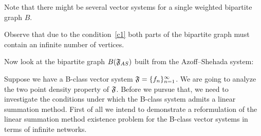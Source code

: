 \documentclass[12pt]{amsart}
\begin{document}
    \begin{remark}
      Note that there might be several vector systems for a single weighted bipartite graph $B$.
    \end{remark}
    \begin{remark}
      Observe that due to the condition~\ref{c1} both parts of the bipartite graph must
        contain an infinite number of vertices.
    \end{remark}
    \begin{example}
      Now look at the bipartite graph $B(\mathfrak{F}_{AS})$ built from the Azoff--Shehada system:
      \begin{center}
      \end{center}
    \end{example}
    Suppose we have a B-class vector system $\mathfrak{F}=\{{f}_n\}_{n=1}^\infty$.
    We are going to analyze the two point density property of $\mathfrak{F}$.
    Before we pursue that, we need to investigate the conditions under which the B-class system admits a linear summation method.
    First of all we intend to demonstrate a reformulation of the linear summation method existence problem for
      the B-class vector systems in terms of infinite networks.
\end{document}
